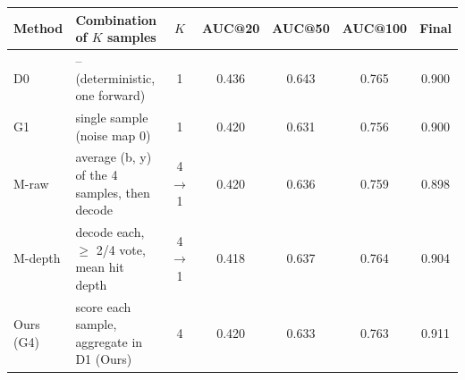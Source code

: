 \begin{tabular}{llccccc}
\toprule
Method & Combination of $K$ samples & $K$ & AUC@20 & AUC@50 & AUC@100 & Final \\
\midrule
D0 & -- (deterministic, one forward) & 1 & 0.436 & 0.643 & 0.765 & 0.900 \\
G1 & single sample (noise map 0) & 1 & 0.420 & 0.631 & 0.756 & 0.900 \\
M-raw & average (b, y) of the 4 samples, then decode & 4 $\to$ 1 & 0.420 & 0.636 & 0.759 & 0.898 \\
M-depth & decode each, $\ge$ 2/4 vote, mean hit depth & 4 $\to$ 1 & 0.418 & 0.637 & 0.764 & 0.904 \\
Ours (G4) & score each sample, aggregate in D1 (Ours) & 4 & 0.420 & 0.633 & 0.763 & 0.911 \\
\bottomrule
\end{tabular}

